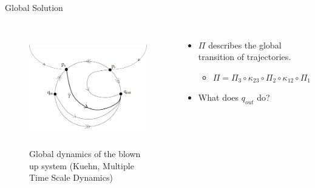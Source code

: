 \documentclass[11pt]{beamer}
\begin{document}
\begin{frame}{Global Solution}
\begin{columns}
\begin{figure}

\includegraphics[height=5cm,width=7cm]{Blow_up_fold.png}
\caption{Global dynamics of the blown up system (Kuehn, Multiple Time Scale Dynamics)}

\end{figure}
\begin{itemize}
\item $\Pi$ describes the global transition of trajectories.
\begin{itemize}
\item $\Pi=\Pi_3\circ\kappa_{23}\circ\Pi_2\circ\kappa_{12}\circ\Pi_1$
\end{itemize}
\item What does $q_{out}$ do?
\end{itemize}
\end{columns}
\end{frame}%
\end{document}
